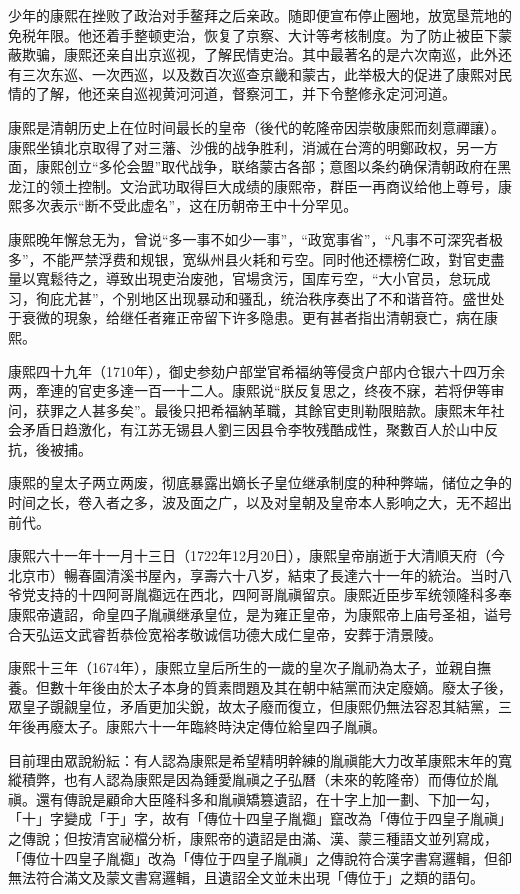 少年的康熙在挫败了政治对手鳌拜之后亲政。随即便宣布停止圈地，放宽垦荒地的免税年限。他还着手整顿吏治，恢复了京察、大计等考核制度。为了防止被臣下蒙蔽欺骗，康熙还亲自出京巡视，了解民情吏治。其中最著名的是六次南巡，此外还有三次东巡、一次西巡，以及数百次巡查京畿和蒙古，此举极大的促进了康熙对民情的了解，他还亲自巡视黄河河道，督察河工，并下令整修永定河河道。

康熙是清朝历史上在位时间最长的皇帝（後代的乾隆帝因崇敬康熙而刻意禪讓）。康熙坐镇北京取得了对三藩、沙俄的战争胜利，消滅在台湾的明鄭政权，另一方面，康熙创立“多伦会盟”取代战争，联络蒙古各部；意图以条约确保清朝政府在黑龙江的领土控制。文治武功取得巨大成绩的康熙帝，群臣一再商议给他上尊号，康熙多次表示“断不受此虚名”，这在历朝帝王中十分罕见。

康熙晚年懈怠无为，曾说“多一事不如少一事”，“政宽事省”，“凡事不可深究者极多”，不能严禁浮费和规银，宽纵州县火耗和亏空。同时他还標榜仁政，對官吏盡量以寬鬆待之，導致出現吏治废弛，官場贪污，国库亏空，“大小官员，怠玩成习，徇庇尤甚”，个别地区出现暴动和骚乱，统治秩序奏出了不和谐音符。盛世处于衰微的現象，给继任者雍正帝留下许多隐患。更有甚者指出清朝衰亡，病在康熙。

康熙四十九年（1710年），御史参劾户部堂官希福纳等侵贪户部内仓银六十四万余两，牽連的官吏多達一百一十二人。康熙说“朕反复思之，终夜不寐，若将伊等审问，获罪之人甚多矣”。最後只把希福納革職，其餘官吏則勒限賠款。康熙末年社会矛盾日趋激化，有江苏无锡县人劉三因县令李牧残酷成性，聚數百人於山中反抗，後被捕。

康熙的皇太子两立两废，彻底暴露出嫡长子皇位继承制度的种种弊端，储位之争的时间之长，卷入者之多，波及面之广，以及对皇朝及皇帝本人影响之大，无不超出前代。

康熙六十一年十一月十三日（1722年12月20日），康熙皇帝崩逝于大清順天府（今北京市）暢春園清溪书屋內，享壽六十八岁，結束了長達六十一年的統治。当时八爷党支持的十四阿哥胤禵远在西北，四阿哥胤禛留京。康熙近臣步军统领隆科多奉康熙帝遺詔，命皇四子胤禛继承皇位，是为雍正皇帝，为康熙帝上庙号圣祖，谥号合天弘运文武睿哲恭俭宽裕孝敬诚信功德大成仁皇帝，安葬于清景陵。

康熙十三年（1674年），康熙立皇后所生的一歲的皇次子胤礽為太子，並親自撫養。但數十年後由於太子本身的質素問題及其在朝中結黨而決定廢嫡。廢太子後，眾皇子覬覦皇位，矛盾更加尖銳，故太子廢而復立，但康熙仍無法容忍其結黨，三年後再廢太子。康熙六十一年臨終時決定傳位給皇四子胤禛。

目前理由眾說紛紜：有人認為康熙是希望精明幹練的胤禛能大力改革康熙末年的寬縱積弊，也有人認為康熙是因為鍾愛胤禛之子弘曆（未來的乾隆帝）而傳位於胤禛。還有傳說是顧命大臣隆科多和胤禛矯篡遺詔，在十字上加一劃、下加一勾，「十」字變成「于」字，故有「傳位十四皇子胤禵」竄改為「傳位于四皇子胤禛」之傳說；但按清宮祕檔分析，康熙帝的遺詔是由滿、漢、蒙三種語文並列寫成，「傳位十四皇子胤禵」改為「傳位于四皇子胤禛」之傳說符合漢字書寫邏輯，但卻無法符合滿文及蒙文書寫邏輯，且遺詔全文並未出現「傳位于」之類的語句。


